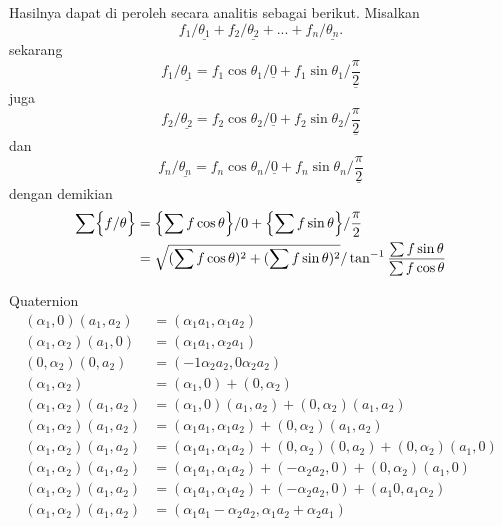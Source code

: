 \documentclass{article}
\begin{document}
Hasilnya dapat di peroleh secara analitis sebagai berikut.
Misalkan 
\[
f_1/\underline{\theta_1} + f_2/\underline{\theta_2} +  ... + f_n/\underline{\theta_n}.
\]
sekarang
\[
f_1/\underline{\theta_1} = f_1\cos\theta_1/\underline{0} + f_1\sin\theta_1/\underline{\frac{\pi}{2}} 
\]
juga
\[
f_2/\underline{\theta_2} = f_2\cos\theta_2/\underline{0} + f_2\sin\theta_2/\underline{\frac{\pi}{2}} 
\]
dan
\[
f_n/\underline{\theta_n} = f_n\cos\theta_n/\underline{0} + f_n\sin\theta_n/\underline{\frac{\pi}{2}} 
\]
dengan demikian
\begin{align*}
\sum\Bigl\lbrace f/\theta \Bigr\rbrace &= \Bigl\lbrace \sum{f \cos\theta}\Bigr\rbrace/0 + \Bigl\lbrace\sum{f \sin\theta}\Bigr\rbrace/\frac{\pi}{2}\\
&=\sqrt{(\sum{f \cos\theta})^2 + (\sum{f \sin \theta})^2}/\tan^{-1}\frac{\sum f \sin \theta}{\sum f \cos \theta}
\end{align*}

Quaternion
\begin{align*}
(\alpha_1, 0) (a_1, a_2) &= (\alpha_1 a_1, \alpha_1 a_2)\\
(\alpha_1, \alpha_2) (a_1, 0) &= (\alpha_1 a_1, \alpha_2 a_1)\\
(0, \alpha_2)(0, a_2) &= (-1 \alpha_2 a_2, 0 \alpha_2 a_2)\\
(\alpha_1, \alpha_2) &= (\alpha_1, 0) + (0, \alpha_2)\\
(\alpha_1, \alpha_2) (a_1, a_2) &= (\alpha_1, 0)(a_1, a_2) + (0, \alpha_2)(a_1, a_2)\\
(\alpha_1, \alpha_2) (a_1, a_2) &= (\alpha_1 a_1, \alpha_1 a_2) + (0, \alpha_2)(a_1, a_2)\\
(\alpha_1, \alpha_2) (a_1, a_2) &= (\alpha_1 a_1, \alpha_1 a_2) + (0, \alpha_2)(0, a_2) + (0, \alpha_2)(a_1, 0)\\
(\alpha_1, \alpha_2) (a_1, a_2) &= (\alpha_1 a_1, \alpha_1 a_2) + (-\alpha_2 a_2, 0) + (0, \alpha_2)(a_1, 0)\\
(\alpha_1, \alpha_2) (a_1, a_2) &= (\alpha_1 a_1, \alpha_1 a_2) + (-\alpha_2 a_2, 0) + (a_1 0, a_1 \alpha_2)\\
(\alpha_1, \alpha_2) (a_1, a_2) &= (\alpha_1 a_1 -\alpha_2 a_2 , \alpha_1 a_2 + \alpha_2 a_1)
\end{align*}
\end{document}
